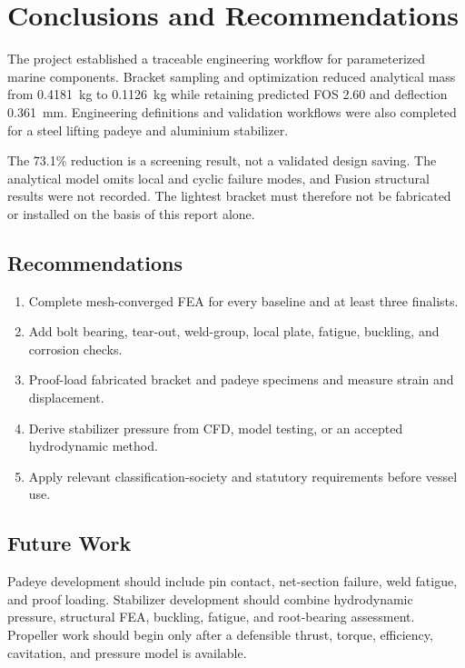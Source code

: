\chapter{Conclusions and Recommendations}
\label{chap:conclusion}

The project established a traceable engineering workflow for parameterized marine components. Bracket sampling and optimization reduced analytical mass from 0.4181~kg to 0.1126~kg while retaining predicted FOS 2.60 and deflection 0.361~mm. Engineering definitions and validation workflows were also completed for a steel lifting padeye and aluminium stabilizer.

The 73.1\% reduction is a screening result, not a validated design saving. The analytical model omits local and cyclic failure modes, and Fusion structural results were not recorded. The lightest bracket must therefore not be fabricated or installed on the basis of this report alone.

\section{Recommendations}
\begin{enumerate}
\item Complete mesh-converged FEA for every baseline and at least three finalists.
\item Add bolt bearing, tear-out, weld-group, local plate, fatigue, buckling, and corrosion checks.
\item Proof-load fabricated bracket and padeye specimens and measure strain and displacement.
\item Derive stabilizer pressure from CFD, model testing, or an accepted hydrodynamic method.
\item Apply relevant classification-society and statutory requirements before vessel use.
\end{enumerate}

\section{Future Work}
Padeye development should include pin contact, net-section failure, weld fatigue, and proof loading. Stabilizer development should combine hydrodynamic pressure, structural FEA, buckling, fatigue, and root-bearing assessment. Propeller work should begin only after a defensible thrust, torque, efficiency, cavitation, and pressure model is available.
